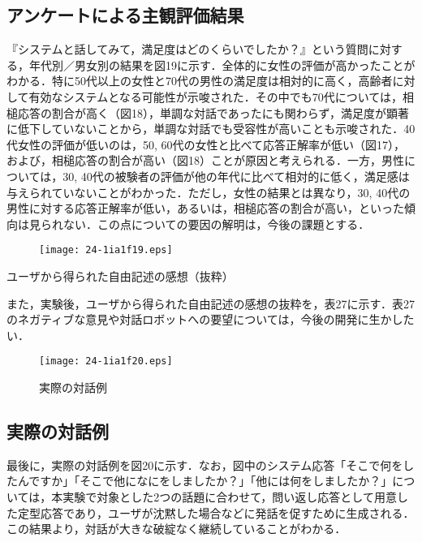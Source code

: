 \documentclass[japanese]{jnlp_1.4}
\begin{document}
\subsection{アンケートによる主観評価結果}

『システムと話してみて，満足度はどのくらいでしたか？』という質問に対する，年代別／男女別の結果を図19に示す．全体的に女性の評価が高かったことがわかる．特に50代以上の女性と70代の男性の満足度は相対的に高く，高齢者に対して有効なシステムとなる可能性が示唆された．その中でも70代については，相槌応答の割合が高く（図18），単調な対話であったにも関わらず，満足度が顕著に低下していないことから，単調な対話でも受容性が高いことも示唆された．40代女性の評価が低いのは，50, 60代の女性と比べて応答正解率が低い（図17），および，相槌応答の割合が高い（図18）ことが原因と考えられる．一方，男性については，30, 40代の被験者の評価が他の年代に比べて相対的に低く，満足感は与えられていないことがわかった．ただし，女性の結果とは異なり，30, 40代の男性に対する応答正解率が低い，あるいは，相槌応答の割合が高い，といった傾向は見られない．この点についての要因の解明は，今後の課題とする．

\begin{figure}[b]
\begin{center}
\texttt{[image: 24-1ia1f19.eps]}
\end{center}
\label{fig:19}
\end{figure}

\begin{table}[b]
\centering
\caption{ユーザから得られた自由記述の感想（抜粋）}
\label{table:27}

\end{table}

また，実験後，ユーザから得られた自由記述の感想の抜粋を，表27に示す．表27のネガティブな意見や対話ロボットへの要望については，今後の開発に生かしたい．

\begin{figure}[b]
\begin{center}
\texttt{[image: 24-1ia1f20.eps]}
\end{center}
\caption{実際の対話例}
\label{fig:20}
\end{figure}


\subsection{実際の対話例}

最後に，実際の対話例\cite{no50}を図20に示す．なお，図中のシステム応答「そこで何をしたんですか」「そこで他になにをしましたか？」「他には何をしましたか？」については，本実験で対象とした2つの話題に合わせて，問い返し応答として用意した定型応答であり，ユーザが沈黙した場合などに発話を促すために生成される．この結果より，対話が大きな破綻なく継続していることがわかる．
\end{document}
